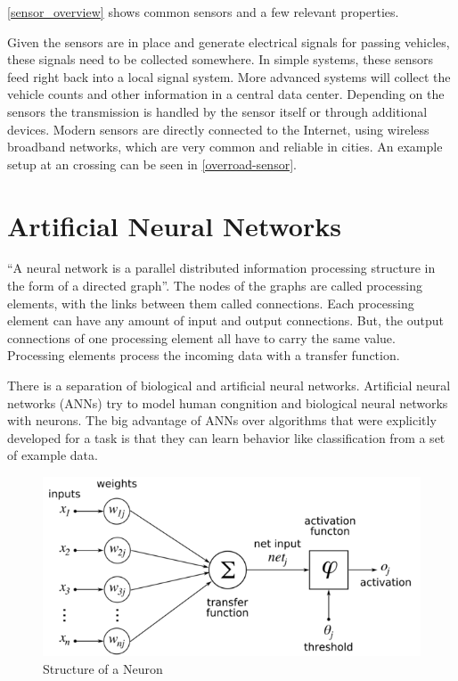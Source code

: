 \autoref{sensor_overview} shows common sensors and a few relevant properties.

Given the sensors are in place and generate electrical signals for passing vehicles, these signals need to be collected somewhere. In simple systems, these sensors feed right back into a local signal system. More advanced systems will collect the vehicle counts and other information in a central data center. Depending on the sensors the transmission is handled by the sensor itself or through additional devices. Modern sensors are directly connected to the Internet, using wireless broadband networks, which are very common and reliable in cities. An example setup at an crossing can be seen in \autoref{overroad-sensor}.

\section{Artificial Neural Networks}
\label{sec:ann}

``A neural network is a parallel distributed information processing structure in the
form of a directed graph''. \cite{introToNNs} The nodes of the graphs are called processing elements, with the links between them called connections. Each processing element can have any amount of input and output connections. But, the output connections of one processing element all have to carry the same value. Processing elements process the incoming data with a transfer function. \cite{introToNNs}

There is a separation of biological and artificial neural networks. Artificial neural networks (ANNs) try to model human congnition and biological neural networks with neurons. \cite{logicalCalculus1943} 
The big advantage of ANNs over algorithms that were explicitly developed for a task is that they can learn behavior like classification from a set of example data. 

\begin{figure}[ht]
	\centering
  \includegraphics[width=15cm]{figures/neuron_structure}
	\caption[Structure of a Neuron]{Structure of a Neuron \protect\footnotemark}
	\label{neuron}
\end{figure}

